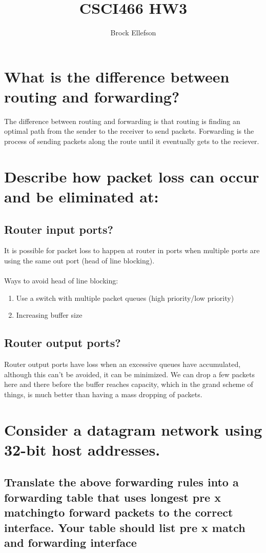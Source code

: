 \documentclass[10pt,letterpaper]{article}
\author{Brock Ellefson}
\title{CSCI466 HW3}
\begin{document}
\maketitle
\section{What is the difference between routing and forwarding?}
The difference between routing and forwarding is that routing is finding an optimal path from the sender to the receiver to send packets. Forwarding is the process of sending packets along the route until it eventually gets to the reciever. 

\section{Describe how packet loss can occur and be eliminated at:}
\subsection{Router input ports?}
It is possible for packet loss to happen at router in ports when multiple ports are using the same out port (head of line blocking).
\\ \\
Ways to avoid head of line blocking:
\begin{enumerate}
  \item Use a switch with multiple packet queues (high priority/low priority) 
  \item Increasing buffer size 
\end{enumerate}

\subsection{Router output ports?}
Router output ports have loss when an excessive queues have  
accumulated, although this can't be avoided, it can be minimized. We can drop a few packets here and there before the buffer reaches capacity, which in the grand scheme of things, is much better than having a mass dropping of packets.


\section{Consider a datagram network using 32-bit host addresses.}
\subsection{Translate  the  above  forwarding  rules  into  a  forwarding  table  that  uses  longest  pre x  matchingto  forward  packets  to  the  correct  interface.   Your  table  should  list  pre x  match  and  forwarding interface} 
\end{document}
